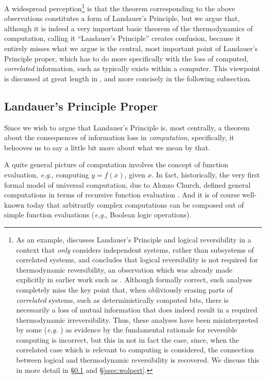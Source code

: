 \documentclass[preprints,article,accept,moreauthors,pdftex]{Definitions/mdpi}
\begin{document}
\begin{paracol}{2}
A widespread perception\footnote{As an example, \cite{Sagawa14} discusses Landauer's Principle and logical reversibility in a context that \textit{only} considers independent systems, rather than subsystems of correlated systems, and concludes that logical reversibility is not required for thermodynamic reversibility, an observation which was already made explicitly in earlier work such as \cite{Ben03}. Although formally correct, such analyses completely miss the key point that, when obliviously erasing parts of \textit{correlated} systems, such as deterministically computed bits, there is necessarily a loss of mutual information that does indeed result in a required thermodynamic irreversibility. Thus, these analyses have been misinterpreted by some (\textit{e.g.} \cite{Wol19a,Wol19b}) as evidence by the fundamental rationale for reversible computing is incorrect, but this in not in fact the case, since, when the correlated case which is relevant to computing is considered, the connection between logical and thermodynamic reversibility is recovered. We discuss this in more detail in \S\ref{ssec:lan-prin} and \S\ref{ssec:wolpert}.\label{foot:bad-Sagawa}} is that the theorem corresponding to the above observations constitutes a form of Landauer's Principle, but we argue that, although it is indeed a very important basic theorem of the thermodynamics of computation, calling it ``Landauer's Principle'' creates confusion, because it entirely misses what we argue is the central, most important point of Landauer's Principle proper, which has to do more specifically with the loss of computed, \emph{correlated} information, such as typically exists within a computer. This viewpoint is discussed at great length in \cite{Fra18}, and more concisely in the following subsection.

\subsection{Landauer's Principle Proper}
\label{ssec:lan-prin}

Since we wish to argue that Landauer's Principle is, most centrally, a theorem about the consequences of information loss in \emph{computation}, specifically, it behooves us to say a little bit more about what we mean by that. 

A quite general picture of computation involves the concept of function evaluation, \emph{e.g.}, computing $y=f(x)$, given $x$. In fact, historically, the very first formal model of universal computation, due to Alonzo Church, defined general computations in terms of recursive function evaluation \cite{Chu36}. And it is of course well-known today that arbitrarily complex computations can be composed out of simple function evaluations (\emph{e.g.}, Boolean logic operations).


\end{paracol}
\end{document}
